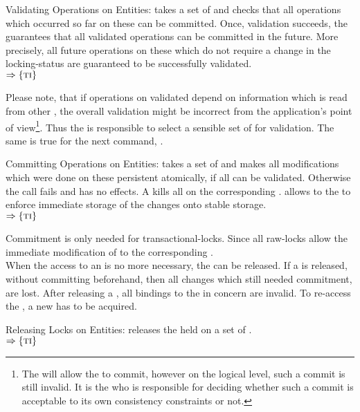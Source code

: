 \documentclass[a4paper, 12pt]{book}
\newcommand{\INTERFACE}[1]{$\Rightarrow\left\{#1\right\}$}
\begin{document}
\begin{requirement*}{Validating Operations on Entities: \dbaiVALIDATE}
  \dbaiVALIDATE takes a set of  and checks that all operations
  which occurred so far on these  can be committed. Once,
  validation succeeds, the \SYNEIGHT guarantees that all validated
  operations can be committed in the future. More precisely, all future
  operations on these  which do not require a change in the
  locking-status are guaranteed to be successfully validated.\\
  \INTERFACE{\TRANSACTION}
\end{requirement*}
%
Please note, that if operations on validated  depend on
information which is read from other , the overall
validation might be incorrect from the application's point of
view\footnote{The \SYNEIGHT will allow the  to
commit, however on the logical level, such a commit is still
invalid. It is the  who is responsible for deciding whether
such a commit is acceptable to its own consistency constraints or
not.}. Thus the  is responsible to select a sensible set of
 for validation. The same is true for the next command,
\dbaiCOMMIT.
%
\begin{requirement*}{Committing Operations on Entities: \dbaiCOMMIT}
  \dbaiCOMMIT takes a set of  and makes all modifications which
  were done on these  persistent atomically, if all 
  can be validated. Otherwise the call fails and has no effects. A \dbaiCOMMIT
  kills all  on the corresponding .
  \dbaiCOMMIT allows to the  to enforce immediate storage of the
  changes onto stable storage.\\
  \INTERFACE{\TRANSACTION}
\end{requirement*}
%
Commitment is only needed for transactional-locks. Since all
raw-locks allow the immediate modification of to the corresponding .\\
%
When the access to an  is no more necessary, the  can
be released. If a  is released, without committing beforehand, then
all changes which still needed commitment, are lost. After releasing a
, all bindings to the  in concern are invalid. To
re-access the , a new  has to be acquired. 

\begin{requirement*}{Releasing Locks on Entities: \dbaiRELEASE}
  \dbaiRELEASE releases the  held on a set of .\\
  \INTERFACE{\TRANSACTION}
\end{requirement*}
\end{document}
